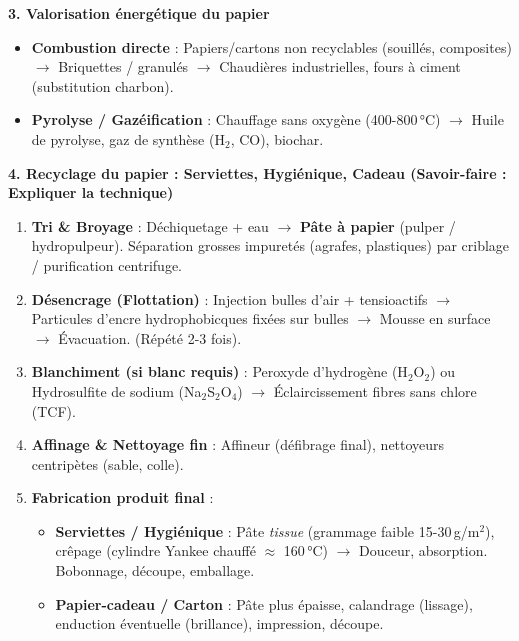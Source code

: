 \documentclass[11pt]{article}
\begin{document}
\begin{bilan}
\textbf{3. Valorisation énergétique du papier}
\begin{itemize}
    \item \textbf{Combustion directe} : Papiers/cartons non recyclables (souillés, composites) $\to$ Briquettes / granulés $\to$ Chaudières industrielles, fours à ciment (substitution charbon).
    \item \textbf{Pyrolyse / Gazéification} : Chauffage sans oxygène (400-800\,°C) $\to$ Huile de pyrolyse, gaz de synthèse (H$_2$, CO), biochar.
\end{itemize}

\textbf{4. Recyclage du papier : Serviettes, Hygiénique, Cadeau (Savoir-faire : Expliquer la technique)}
\begin{methode}
\begin{enumerate}
    \item \textbf{Tri \& Broyage} : Déchiquetage + eau $\to$ \textbf{Pâte à papier} (pulper / hydropulpeur). Séparation grosses impuretés (agrafes, plastiques) par criblage / purification centrifuge.
    \item \textbf{Désencrage (Flottation)} : Injection bulles d'air + tensioactifs $\to$ Particules d'encre hydrophobicques fixées sur bulles $\to$ Mousse en surface $\to$ Évacuation. (Répété 2-3 fois).
    \item \textbf{Blanchiment (si blanc requis)} : Peroxyde d'hydrogène (H$_2$O$_2$) ou Hydrosulfite de sodium (Na$_2$S$_2$O$_4$) $\to$ Éclaircissement fibres sans chlore (TCF).
    \item \textbf{Affinage \& Nettoyage fin} : Affineur (défibrage final), nettoyeurs centripètes (sable, colle).
    \item \textbf{Fabrication produit final} :
    \begin{itemize}
        \item \textbf{Serviettes / Hygiénique} : Pâte \emph{tissue} (grammage faible 15-30\,g/m$^2$), crêpage (cylindre Yankee chauffé $\approx$ 160\,°C) $\to$ Douceur, absorption. Bobonnage, découpe, emballage.
        \item \textbf{Papier-cadeau / Carton} : Pâte plus épaisse, calandrage (lissage), enduction éventuelle (brillance), impression, découpe.
    \end{itemize}
\end{enumerate}
\end{methode}


\end{bilan}
\end{document}
